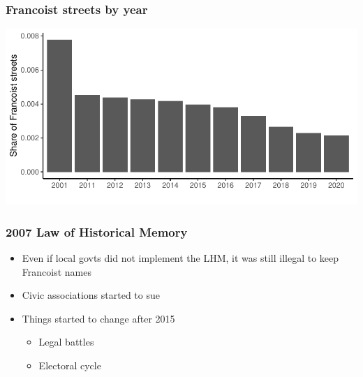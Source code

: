 \documentclass[aspectratio=43]{beamer}
\begin{document}
\begin{frame}
\frametitle{Francoist streets by year}
\centering

\includegraphics[width = \textwidth]{../descriptives/output/fs_by_year}

\end{frame}

\begin{frame}
\frametitle{2007 Law of Historical Memory}
\centering

\begin{itemize}[<+->]
  \item Even if local govts did not implement the LHM, it was still illegal to keep Francoist names
  \item Civic associations started to sue
  \item Things started to change after 2015
  \begin{itemize}
    \item Legal battles
    \item Electoral cycle
  \end{itemize}
\end{itemize}

\end{frame}



\end{document}
